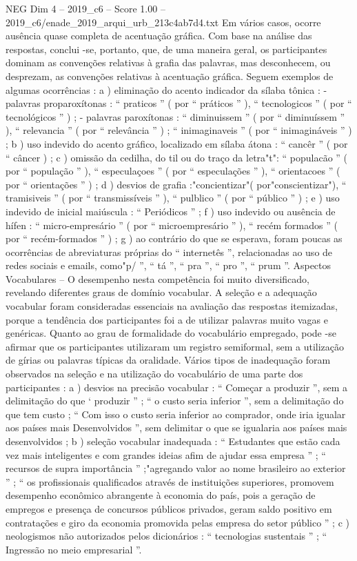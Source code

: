 \begin{textsample}{NEG Dim 4 – 2019\_c6 – Score 1.00 – 2019\_c6/enade\_2019\_arqui\_urb\_213c4ab7d4.txt}
Em vários casos, ocorre ausência quase completa de acentuação gráfica.
Com base na análise das respostas, conclui -se, portanto, que, de uma maneira geral, os participantes dominam as convenções relativas à grafia das palavras, mas desconhecem, ou desprezam, as convenções relativas à acentuação gráfica.
Seguem exemplos de algumas ocorrências : a ) eliminação do acento indicador da sílaba tônica : - palavras proparoxítonas : “ praticos ” ( por “ práticos ” ), “ tecnologicos ” ( por “ tecnológicos ” ) ; - palavras paroxítonas : “ diminuissem ” ( por “ diminuíssem ” ), “ relevancia ” ( por “ relevância ” ) ; “ inimaginaveis ” ( por “ inimagináveis ” ) ; b ) uso indevido do acento gráfico, localizado em sílaba átona : “ cancêr ” ( por “ câncer ) ; c ) omissão da cedilha, do til ou do traço da letra"t": “ populacão ” ( por “ população ” ), “ especulaçoes ” ( por “ especulações ” ), “ orientacoes ” ( por “ orientações ” ) ; d ) desvios de grafia :"concientizar"( por"conscientizar"), “ tramisiveis ” ( por “ transmissíveis ” ), “ pulblico ” ( por “ público ” ) ; e ) uso indevido de inicial maiúscula : “ Periódicos ” ; f ) uso indevido ou ausência de hífen : “ micro-empresário ” ( por “ microempresário ” ), “ recém formados ” ( por “ recém-formados ” ) ; g ) ao contrário do que se esperava, foram poucas as ocorrências de abreviaturas próprias do “ internetês ”, relacionadas ao uso de redes sociais e emails, como"p/ ”, “ tá ”, “ pra ”, “ pro ”, “ prum ”.
Aspectos Vocabulares – O desempenho nesta competência foi muito diversificado, revelando diferentes graus de domínio vocabular.
A seleção e a adequação vocabular foram consideradas essenciais na avaliação das respostas itemizadas, porque a tendência dos participantes foi a de utilizar palavras muito vagas e genéricas.
Quanto ao grau de formalidade do vocabulário empregado, pode -se afirmar que os participantes utilizaram um registro semiformal, sem a utilização de gírias ou palavras típicas da oralidade.
Vários tipos de inadequação foram observados na seleção e na utilização do vocabulário de uma parte dos participantes : a ) desvios na precisão vocabular : “ Começar a produzir ”, sem a delimitação do que ‘ produzir ” ; “ o custo seria inferior ”, sem a delimitação do que tem custo ; “ Com isso o custo seria inferior ao comprador, onde iria igualar aos países mais Desenvolvidos ”, sem delimitar o que se igualaria aos países mais desenvolvidos ; b ) seleção vocabular inadequada : “ Estudantes que estão cada vez mais inteligentes e com grandes ideias afim de ajudar essa empresa ” ; “ recursos de supra importância ” ;"agregando valor ao nome brasileiro ao exterior ” ; “ os profissionais qualificados através de instituições superiores, promovem desempenho econômico abrangente à economia do país, pois a geração de empregos e presença de concursos públicos privados, geram saldo positivo em contratações e giro da economia promovida pelas empresa do setor público ” ; c ) neologismos não autorizados pelos dicionários : “ tecnologias sustentais ” ; “ Ingressão no meio empresarial ”.

\end{textsample}
